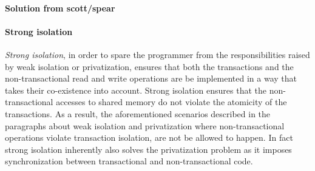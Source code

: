 \paragraph{Solution from scott/spear}

\paragraph{Strong isolation}

\emph{Strong isolation}, in order to spare the programmer from the responsibilities
raised by weak isolation or privatization, ensures that  
both the  transactions  and  the non-transactional
read and write operations are be implemented in a way  
that  takes their co-existence  into account.
Strong isolation ensures that the non-transactional accesses to shared memory
do not violate the atomicity of the transactions.
As a result,
the aforementioned scenarios described in the paragraphs about weak isolation
and privatization  where non-transactional operations  violate
transaction isolation, are not be allowed to happen.  
In fact strong isolation
inherently also solves the privatization problem as it
imposes synchronization between transactional and non-transactional code.


